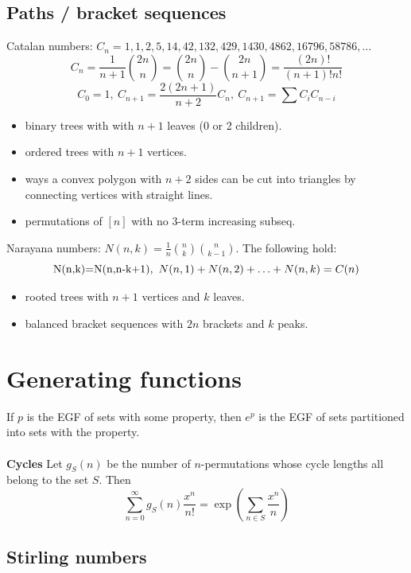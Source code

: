 \subsection{Paths / bracket sequences}
Catalan numbers: ${C_n = 1, 1, 2, 5, 14, 42, 132, 429, 1430, 4862, 16796, 58786, \dots}$
\[ C_n=\frac{1}{n+1}\binom{2n}{n}= \binom{2n}{n}-\binom{2n}{n+1} = \frac{(2n)!}{(n+1)!n!} \]
\[ C_0=1,\ C_{n+1} = \frac{2(2n+1)}{n+2}C_n,\ C_{n+1}=\sum C_iC_{n-i} \]
\begin{itemize}[noitemsep]
    \item binary trees with with $n+1$ leaves (0 or 2 children).
    \item ordered trees with $n+1$ vertices.
    \item ways a convex polygon with $n+2$ sides can be cut into triangles by connecting vertices with straight lines.
    \item permutations of $[n]$ with no 3-term increasing subseq.
\end{itemize}
Narayana numbers: $N(n,k) = \frac{1}{n}\binom{n}{k}\binom{n}{k-1}$. The following hold:
\[ $N(n,k)=N(n,n-k+1)$, \ N(n,1) + N(n,2) + \ldots + N(n,k) = C(n) \]
\begin{itemize}[noitemsep]
    \item rooted trees with $n+1$ vertices and $k$ leaves.
    \item balanced bracket sequences with $2n$ brackets and $k$ peaks.
\end{itemize}

\section{Generating functions}
If $p$ is the EGF of sets with some property, then $e^p$ is the EGF of sets partitioned into sets with the property.\\
\vspace{3pt}\\
\textbf{Cycles} Let $g_S(n)$ be the number of $n$-permutations whose cycle lengths all belong to the set $S$. Then
\[ \sum_{n=0} ^\infty g_S(n) \frac{x^n}{n!} = \exp\left(\sum_{n\in S} \frac{x^n} {n} \right) \]

\subsection{Stirling numbers}

